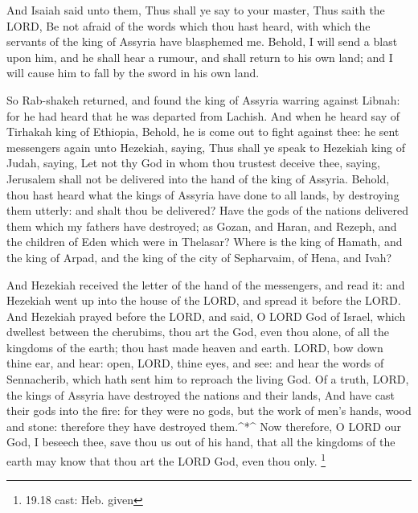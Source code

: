  And Isaiah said unto them, Thus shall ye say to your
master, Thus saith the LORD, Be not afraid of the words which thou hast
heard, with which the servants of the king of Assyria have blasphemed
me.  Behold, I will send a blast upon him, and he shall hear
a rumour, and shall return to his own land; and I will cause him to fall
by the sword in his own land.

 So Rab-shakeh returned, and found the king of Assyria
warring against Libnah: for he had heard that he was departed from
Lachish.  And when he heard say of Tirhakah king of
Ethiopia, Behold, he is come out to fight against thee: he sent
messengers again unto Hezekiah, saying,  Thus shall ye
speak to Hezekiah king of Judah, saying, Let not thy God in whom thou
trustest deceive thee, saying, Jerusalem shall not be delivered into the
hand of the king of Assyria.  Behold, thou hast heard what
the kings of Assyria have done to all lands, by destroying them utterly:
and shalt thou be delivered?  Have the gods of the nations
delivered them which my fathers have destroyed; as Gozan, and Haran, and
Rezeph, and the children of Eden which were in Thelasar? 
Where is the king of Hamath, and the king of Arpad, and the king of the
city of Sepharvaim, of Hena, and Ivah?

 And Hezekiah received the letter of the hand of the
messengers, and read it: and Hezekiah went up into the house of the
LORD, and spread it before the LORD.  And Hezekiah prayed
before the LORD, and said, O LORD God of Israel, which dwellest between
the cherubims, thou art the God, even thou alone, of all the kingdoms of
the earth; thou hast made heaven and earth.  LORD, bow down
thine ear, and hear: open, LORD, thine eyes, and see: and hear the words
of Sennacherib, which hath sent him to reproach the living God.
 Of a truth, LORD, the kings of Assyria have destroyed the
nations and their lands,  And have cast their gods into the
fire: for they were no gods, but the work of men's hands, wood and
stone: therefore they have destroyed them.\^{}*\^{}  Now
therefore, O LORD our God, I beseech thee, save thou us out of his hand,
that all the kingdoms of the earth may know that thou art the LORD God,
even thou only. \footnote{19.18 cast: Heb. given}

